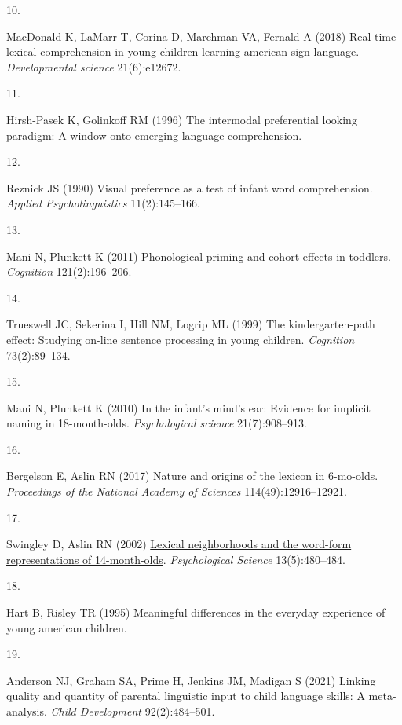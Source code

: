 \documentclass[9pt,twocolumn,twoside,]{pnas-new}
\newlength{\cslhangindent}
\newlength{\csllabelwidth}
\newenvironment{CSLReferences}[2] %
 {\begin{list}{}{%
  \setlength{\itemindent}{0pt}
  \setlength{\leftmargin}{0pt}
  \setlength{\parsep}{0pt}
  \ifodd #1
   \setlength{\leftmargin}{\cslhangindent}
   \setlength{\itemindent}{-1\cslhangindent}
  \fi
  \setlength{\itemsep}{#2\baselineskip}}}
 {\end{list}}
\newcommand{\CSLLeftMargin}[1]{\parbox[t]{\csllabelwidth}{#1}}
\newcommand{\CSLRightInline}[1]{\parbox[t]{\linewidth - \csllabelwidth}{#1}\break}
\begin{document}
\begin{CSLReferences}{0}{1}
\CSLLeftMargin{10. }%
\CSLRightInline{MacDonald K, LaMarr T, Corina D, Marchman VA, Fernald A
(2018) Real-time lexical comprehension in young children learning
american sign language. \emph{Developmental science} 21(6):e12672.}

\CSLLeftMargin{11. }%
\CSLRightInline{Hirsh-Pasek K, Golinkoff RM (1996) The intermodal
preferential looking paradigm: A window onto emerging language
comprehension.}

\CSLLeftMargin{12. }%
\CSLRightInline{Reznick JS (1990) Visual preference as a test of infant
word comprehension. \emph{Applied Psycholinguistics} 11(2):145--166.}

\CSLLeftMargin{13. }%
\CSLRightInline{Mani N, Plunkett K (2011) Phonological priming and
cohort effects in toddlers. \emph{Cognition} 121(2):196--206.}

\CSLLeftMargin{14. }%
\CSLRightInline{Trueswell JC, Sekerina I, Hill NM, Logrip ML (1999) The
kindergarten-path effect: Studying on-line sentence processing in young
children. \emph{Cognition} 73(2):89--134.}

\CSLLeftMargin{15. }%
\CSLRightInline{Mani N, Plunkett K (2010) In the infant's mind's ear:
Evidence for implicit naming in 18-month-olds. \emph{Psychological
science} 21(7):908--913.}

\CSLLeftMargin{16. }%
\CSLRightInline{Bergelson E, Aslin RN (2017) Nature and origins of the
lexicon in 6-mo-olds. \emph{Proceedings of the National Academy of
Sciences} 114(49):12916--12921.}

\CSLLeftMargin{17. }%
\CSLRightInline{Swingley D, Aslin RN (2002)
\href{https://doi.org/10.1111/1467-9280.00485}{{Lexical neighborhoods
and the word-form representations of 14-month-olds}}.
\emph{Psychological Science} 13(5):480--484.}

\CSLLeftMargin{18. }%
\CSLRightInline{Hart B, Risley TR (1995) Meaningful differences in the
everyday experience of young american children.}

\CSLLeftMargin{19. }%
\CSLRightInline{Anderson NJ, Graham SA, Prime H, Jenkins JM, Madigan S
(2021) Linking quality and quantity of parental linguistic input to
child language skills: A meta-analysis. \emph{Child Development}
92(2):484--501.}


\end{CSLReferences}
\end{document}
